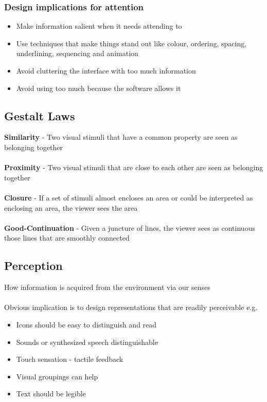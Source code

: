 \documentclass{article}[18pt]
\begin{document}
\subsubsection{Design implications for attention}
\begin{itemize}
	\item Make information salient when it needs attending to
	\item Use techniques that make things stand out like colour, ordering, spacing, underlining, sequencing and animation
	\item Avoid cluttering the interface with too much information
	\item Avoid using too much because the software allows it
\end{itemize}
\subsection{Gestalt Laws}
\textbf{Similarity} - Two visual stimuli that have a common property are seen as belonging together\\
\\
\textbf{Proximity} - Two visual stimuli that are close to each other are seen as belonging together\\
\\
\textbf{Closure} - If a set of stimuli almost encloses an area or could be interpreted as enclosing an area, the viewer sees the area\\
\\
\textbf{Good-Continuation} - Given a juncture of lines, the viewer sees as continuous those lines that are smoothly connected

\subsection{Perception}
How information is acquired from the environment via our senses\\
\\
Obvious implication is to design representations that are readily perceivable e.g.
\begin{itemize}
	\item Icons should be easy to distinguish and read
	\item Sounds or synthesized speech distinguishable
	\item Touch sensation - tactile feedback
	\item Visual groupings can help
	\item Text should be legible
\end{itemize}
\end{document}
